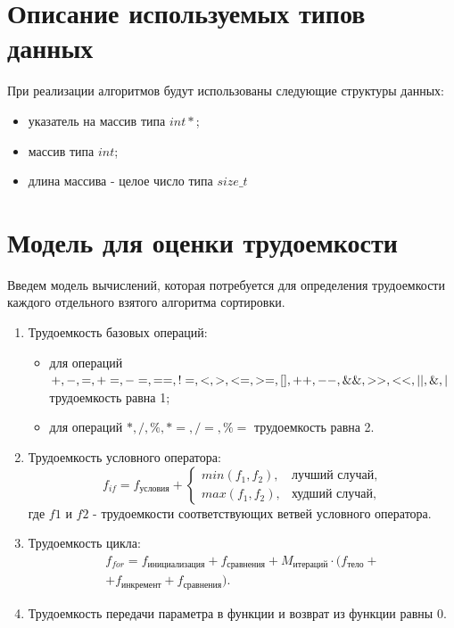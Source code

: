 \clearpage

\section{Описание используемых типов данных}

При реализации алгоритмов будут использованы следующие структуры данных:

\begin{itemize}[label=---]
	\item указатель на массив типа $int *$;
	\item массив типа $int$;
	\item длина массива - целое число типа $size\_t$
\end{itemize}

\section{Модель для оценки трудоемкости}

Введем модель вычислений, которая потребуется для определения трудоемкости каждого отдельного взятого алгоритма сортировки.
\begin{enumerate}[label={\arabic*)}]
	\item Трудоемкость базовых операций:
	\begin{itemize}[label=---]
		\item для операций $+, -, =, +=, -=, ==, !=, <, >, <=, >=, [], ++,\\ {-}-,
			\&\&, >>, <<, ||, \&, |$
		трудоемкость равна 1;
		\item для операций $*, /, \%, *=, /=, \%=$
		трудоемкость равна 2.
	\end{itemize}
	\item Трудоемкость условного оператора:
	\begin{equation}
		\label{for:if}
		f_{if} = f_{\text{условия}} +
		\begin{cases}
			min(f_1, f_2), & \text{лучший случай},\\
			max(f_1, f_2), & \text{худший случай},
		\end{cases}
	\end{equation}
	где $f1$ и $f2$ - трудоемкости соответствующих ветвей условного оператора.
	\item Трудоемкость цикла:
	\begin{equation}
		\label{for:for}
		\begin{gathered}
			f_{for} = f_{\text{инициализация}} + f_{\text{сравнения}} + M_{\text{итераций}} \cdot (f_{\text{тело}} +\\
			+ f_{\text{инкремент}} + f_{\text{сравнения}}).
		\end{gathered}
	\end{equation}
	\item Трудоемкость передачи параметра в функции и возврат из функции равны 0.
\end{enumerate}

